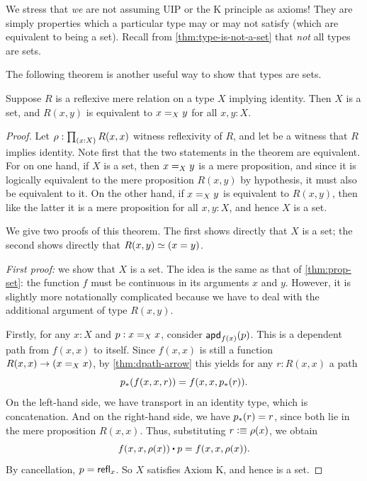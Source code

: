 We stress that \emph{we} are not assuming UIP or the K principle as axioms!
They are simply properties which a particular type may or may not satisfy (which are equivalent to being a set).
Recall from \cref{thm:type-is-not-a-set} that \emph{not} all types are sets.

The following theorem is another useful way to show that types are sets.

\begin{thm}\label{thm:h-set-refrel-in-paths-sets}
  Suppose $R$ is a reflexive mere relation on a type $X$ implying identity.
  Then $X$ is a set, and $R(x,y)$ is equivalent to $\id[X]{x}{y}$ for all $x,y:X$.
\end{thm}

\begin{proof}
  Let $\rho : \prd{x:X} R(x,x)$ witness reflexivity of $R$, and let  be a witness that $R$
implies identity.
  Note first that the two statements in the theorem are equivalent.
  For on one hand, if $X$ is a set, then $\id[X]xy$ is a mere proposition, and since it is logically equivalent to the mere proposition
$R(x,y)$ by hypothesis, it must also be equivalent to it.
  On the other hand, if $\id[X]xy$ is equivalent to $R(x,y)$, then like the latter it is a mere proposition for all $x,y:X$, and hence $X$
is a set.

  We give two proofs of this theorem.
  The first shows directly that $X$ is a set; the second shows directly that $R(x,y)\eqvsym (x=y)$.

  \emph{First proof:} we show that $X$ is a set.
  The idea is the same as that of \cref{thm:prop-set}: the function $f$ must be continuous in its arguments $x$ and $y$.
  However, it is slightly more notationally complicated because we have to deal with the additional argument of type $R(x,y)$.

  Firstly, for any $x:X$ and $p:\id[X]xx$, consider $\apdfunc{f(x)}(p)$.
  This is a dependent path from $f(x,x)$ to itself.
  Since $f(x,x)$ is still a function $R(x,x) \to (\id[X]xx)$, by \cref{thm:dpath-arrow} this yields for any $r:R(x,x)$ a path
  \[\trans{p}{f(x,x,r)} = f(x,x,\trans{p}r).
  \]
  On the left-hand side, we have transport in an identity type, which is concatenation.
  And on the right-hand side, we have $\trans{p}r = r$, since both lie in the mere proposition $R(x,x)$.
  Thus, substituting $r\defeq \rho(x)$, we obtain
  \[ f(x,x,\rho(x)) \ct p = f(x,x,\rho(x)). \]
  By cancellation, $p=\refl{x}$.
  So $X$ satisfies Axiom K, and hence is a set.


\end{proof}
